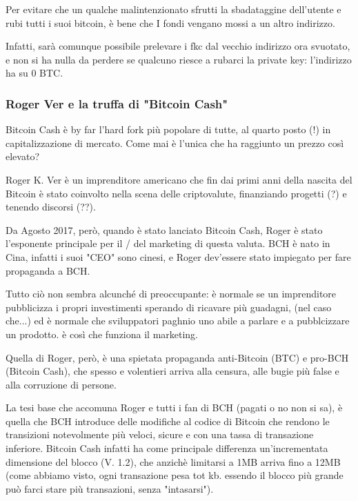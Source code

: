 \documentclass {article}
\begin{document}
Per evitare che un qualche malintenzionato sfrutti la sbadataggine dell'utente e rubi tutti i suoi bitcoin, è bene che I fondi vengano mossi a un altro indirizzo.

Infatti, sarà comunque possibile prelevare i fkc dal vecchio indirizzo ora svuotato, e non si ha nulla da perdere se qualcuno riesce a rubarci la private key: l'indirizzo ha su 0 BTC.



\subsubsection {Roger Ver e la truffa di "Bitcoin Cash"}



Bitcoin Cash è by far l'hard fork più popolare di tutte, al quarto posto (!) in capitalizzazione di mercato. Come mai è l'unica che ha raggiunto un prezzo così elevato?

Roger K. Ver è un imprenditore americano che fin dai primi anni della nascita del Bitcoin è stato coinvolto nella scena delle criptovalute, finanziando progetti (?) e tenendo discorsi (??).

Da Agosto 2017, però, quando è stato lanciato Bitcoin Cash, Roger è stato l'esponente principale per il / del marketing di questa valuta. BCH è nato in Cina, infatti i suoi "CEO" sono cinesi, e Roger dev'essere stato impiegato per fare propaganda a BCH.

Tutto ciò non sembra alcunché di preoccupante: è normale se un imprenditore pubblicizza i propri investimenti sperando di ricavare più guadagni, (nel caso che...) ed è normale che sviluppatori paghnio uno abile a parlare e a pubblcizzare un prodotto. è così che funziona il marketing.

Quella di Roger, però, è una spietata propaganda anti-Bitcoin (BTC) e pro-BCH (Bitcoin Cash), che spesso e volentieri arriva alla censura, alle bugie più false e alla corruzione di persone.

La tesi base che accomuna Roger e tutti i fan di BCH (pagati o no non si sa), è quella che BCH introduce delle modifiche al codice di Bitcoin che rendono le transizioni notevolmente più veloci, sicure e con una tassa di transazione inferiore. Bitcoin Cash infatti ha come principale differenza un'incrementata dimensione del blocco (V. 1.2), che anzichè limitarsi a 1MB arriva fino a 12MB (come abbiamo visto, ogni transazione pesa tot kb. essendo il blocco più grande può farci stare più transazioni, senza "intasarsi").
\end{document}
